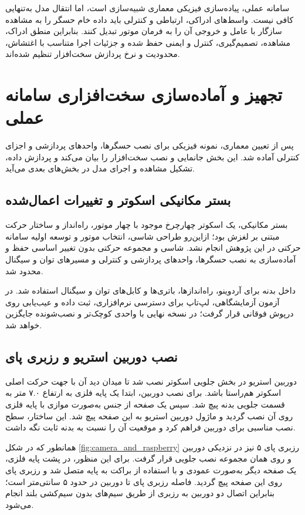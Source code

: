 سامانه عملی، پیاده‌سازی فیزیکی معماری شبیه‌سازی است، اما انتقال مدل به‌تنهایی کافی نیست. واسط‌های ادراکی، ارتباطی و کنترلی باید داده خام حسگر را به مشاهده سازگار با عامل و خروجی آن را به فرمان موتور تبدیل کنند. بنابراین منطق ادراک، مشاهده، تصمیم‌گیری، کنترل و ایمنی حفظ شده و جزئیات اجرا متناسب با اغتشاش، محدودیت و نرخ پردازش سخت‌افزار تنظیم شده‌اند.

\section{تجهیز و آماده‌سازی سخت‌افزاری سامانه عملی}
\label{sec:real_hardware_preparation}

پس از تعیین معماری، نمونه فیزیکی برای نصب حسگرها، واحدهای پردازشی و اجزای کنترلی آماده شد. این بخش جانمایی و نصب سخت‌افزار را بیان می‌کند و پردازش داده، تشکیل مشاهده و اجرای مدل در بخش‌های بعدی می‌آید.

\subsection{بستر مکانیکی اسکوتر و تغییرات اعمال‌شده}
\label{subsec:real_scooter_platform}

بستر مکانیکی، یک اسکوتر چهارچرخ موجود با چهار موتور، راه‌انداز و ساختار حرکت مبتنی بر لغزش بود؛ ازاین‌رو طراحی شاسی، انتخاب موتور و توسعه اولیه سامانه حرکتی در این پژوهش انجام نشد. شاسی و مجموعه حرکتی بدون تغییر اساسی حفظ و آماده‌سازی به نصب حسگرها، واحدهای پردازشی و کنترلی و مسیرهای توان و سیگنال محدود شد.

داخل بدنه برای آردوینو، راه‌اندازها، باتری‌ها و کابل‌های توان و سیگنال استفاده شد. در آزمون آزمایشگاهی، لپ‌تاپ برای دسترسی نرم‌افزاری، ثبت داده و عیب‌یابی روی درپوش فوقانی قرار گرفت؛ در نسخه نهایی با واحدی کوچک‌تر و نصب‌شونده جایگزین خواهد شد.

\subsection{نصب دوربین استریو و رزبری پای}
\label{subsec:stereo_camera_raspberry_installation}

دوربین استریو در بخش جلویی اسکوتر نصب شد تا میدان دید آن با جهت حرکت اصلی اسکوتر هم‌راستا باشد. برای نصب دوربین، ابتدا یک پایه فلزی به ارتفاع ۷.۰ متر به قسمت جلویی بدنه پیچ شد. سپس یک صفحه از جنس  به‌صورت موازی با پایه فلزی روی آن نصب گردید و ماژول دوربین استریو به این صفحه پیچ شد. این ساختار، سطح نصب مناسبی برای دوربین فراهم کرد و موقعیت آن را نسبت به بدنه ثابت نگه داشت.

همانطور که در شکل \ref{fig:camera_and_raspberry} رزبری پای ۵ نیز در نزدیکی دوربین و روی همان مجموعه نصب جلویی قرار گرفت. برای این منظور، در پشت پایه فلزی، یک صفحه  دیگر به‌صورت عمودی و با استفاده از براکت به پایه متصل شد و رزبری پای روی این صفحه پیچ گردید. فاصله رزبری پای تا دوربین در حدود ۵ سانتی‌متر است؛ بنابراین اتصال دو دوربین به رزبری از طریق سیم‌های  بدون سیم‌کشی بلند انجام می‌شود.

